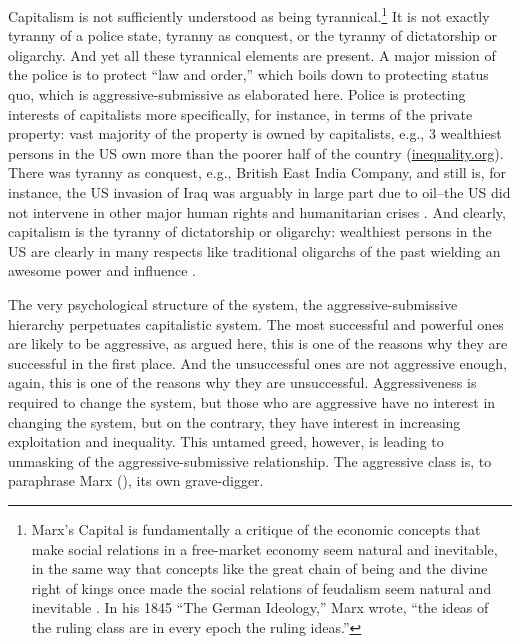 \documentclass[11pt, letterpaper]{article}
\begin{document}
\begin{spacing}{2.0}
Capitalism is not sufficiently understood as being tyrannical.\footnote{Marx's Capital is fundamentally a critique of the economic concepts that make
social relations in a free-market economy seem natural and inevitable, in the
same way that concepts like the great chain of being and the divine right of
kings once made the social relations of feudalism seem natural and
inevitable \citep{menandMISC16oct3}. In his 1845 ``The German Ideology,'' Marx
wrote, ``the ideas of the ruling class are in every epoch the ruling ideas.''
}
 It is not exactly tyranny of a police state, tyranny
as conquest, or the tyranny of dictatorship or oligarchy. And yet all these
tyrannical elements are present. A major mission of the police is to protect
``law and order,'' which boils down to protecting status quo, which is
aggressive-submissive as elaborated here.  %
Police is protecting interests of capitalists
more specifically, for instance, in terms of the private property: vast majority of the property is owned by
capitalists, e.g., 3 wealthiest persons in the US own more than the poorer
half of the country (\url{inequality.org}). %
 There was tyranny as conquest, e.g., British East India Company, and still is,
 for instance, the US invasion of Iraq was arguably in large part due to
 oil--the US did not intervene in other major human rights and humanitarian
 crises \citep{power13}. And clearly, capitalism is the tyranny of
 dictatorship or oligarchy: wealthiest persons in the US are clearly in many
 respects like traditional oligarchs of the past wielding an awesome power and
 influence \citep{mayer17}. 


The very psychological structure of the system, the aggressive-submissive
hierarchy perpetuates capitalistic system.
The most successful and powerful ones are likely to be aggressive, as argued here,
this is one of the reasons why they are successful in the first place. And the
unsuccessful ones are not aggressive enough, again, this is one of the reasons why
they are unsuccessful. Aggressiveness is required to change the system, but those
who are aggressive have no interest in changing the system, but on the contrary,
they have interest in increasing exploitation and inequality. This untamed
greed, however, is leading to unmasking of the aggressive-submissive
relationship. The aggressive class is, to paraphrase Marx (\citeyear{marx12}),
its own grave-digger.


\end{spacing}
\end{document}
